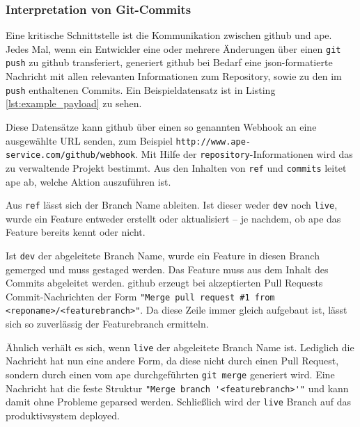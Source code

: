\subsubsection{Interpretation von Git-Commits} %
\label{ssub:interpretation_von_git_commits}

Eine kritische Schnittstelle ist die Kommunikation zwischen \gls{github} und \gls{ape}. Jedes Mal, wenn ein Entwickler eine oder mehrere Änderungen über einen \lstinline!git push! zu \gls{github} transferiert, generiert \gls{github} bei Bedarf eine \gls{json}-formatierte Nachricht mit allen relevanten Informationen zum Repository, sowie zu den im \lstinline!push! enthaltenen Commits. Ein Beispieldatensatz ist in Listing \ref{lst:example_payload} zu sehen.

Diese Datensätze kann \gls{github} über einen so genannten Webhook an eine ausgewählte URL senden, zum Beispiel \lstinline!http://www.ape-service.com/github/webhook!. Mit Hilfe der \lstinline!repository!-Informationen wird das zu verwaltende Projekt bestimmt. Aus den Inhalten von \lstinline!ref! und \lstinline!commits! leitet \gls{ape} ab, welche Aktion auszuführen ist.

Aus \lstinline!ref! lässt sich der Branch Name ableiten. Ist dieser weder \lstinline!dev! noch \lstinline!live!, wurde ein Feature entweder erstellt oder aktualisiert -- je nachdem, ob \gls{ape} das Feature bereits kennt oder nicht.

Ist \lstinline!dev! der abgeleitete Branch Name, wurde ein Feature in diesen Branch gemerged und muss gestaged werden. Das Feature muss aus dem Inhalt des Commits abgeleitet werden. \gls{github} erzeugt bei akzeptierten Pull Requests Commit-Nachrichten der Form \lstinline!"Merge pull request #1 from <reponame>/<featurebranch>"!. Da diese Zeile immer gleich aufgebaut ist, lässt sich so zuverlässig der Featurebranch ermitteln.

Ähnlich verhält es sich, wenn \lstinline!live! der abgeleitete Branch Name ist. Lediglich die Nachricht hat nun eine andere Form, da diese nicht durch einen Pull Request, sondern durch einen vom \gls{ape} durchgeführten \lstinline!git merge! generiert wird. Eine Nachricht hat die feste Struktur \lstinline!"Merge branch '<featurebranch>'"! und kann damit ohne Probleme geparsed werden. Schließlich wird der \lstinline!live! Branch auf das \gls{produktivsystem} deployed.

